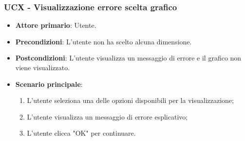 \subsubsection{UCX - Visualizzazione errore scelta grafico}
\begin{itemize}
	\item \textbf{Attore primario}: Utente.
	\item \textbf{Precondizioni}: L'utente non ha scelto alcuna dimensione.
	\item \textbf{Postcondizioni}: L'utente visualizza un messaggio di errore e il grafico non viene visualizzato.
	\item \textbf{Scenario principale}:
		\begin{enumerate}
			\item L'utente seleziona una delle opzioni disponibili per la visualizzazione;
			\item L'utente visualizza un messaggio di errore esplicativo;
			\item L'utente clicca "OK" per continuare.
		\end{enumerate}
\end{itemize}